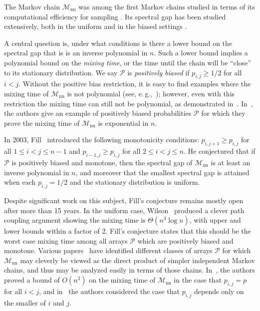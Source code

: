 \documentclass[11pt]{article}
\numberwithin{equation}{section}
\theoremstyle{definition}
\theoremstyle{plain}
\newcommand{\eg}{e.\,g.}
\newcommand{\cM}{\mathcal{M}}
\newcommand{\cP}{\mathcal{P}}
\newcommand{\mn}{\cM_{\text{nn}}}
\begin{document}
The Markov chain $\mn$ was among the first Markov chains studied in 
terms of its computational efficiency for sampling \cite{ald, diasha, 
dsc}. Its spectral gap has been studied extensively, both in 
the uniform and
in the  %
biased settings \cite{BBHM05,bmrs,DSC93b, diasha, wilson}. 

%
%
A central question is, %
under what conditions %
is there a lower bound on the spectral gap that is
is an inverse polynomial in $n$.
%
Such a lower bound    %
implies a polynomial
%
bound 
on the \emph{mixing time}, or the time until the chain will be 
``close'' to its stationary distribution. We say $\cP$ is 
\emph{positively biased} if $p_{i,j}\geq 1/2$ for all $i<j$.
Without the %
%
positive bias  %
restriction, it is easy to find examples where the mixing time of $\mn$ is
not polynomial (see, \eg,~\cite{bmrs}); 
however, even with this restriction the mixing time can still not be polynomial, as demonstrated in~\cite{bmrs}.  In~\cite{bmrs}, the authors give an example of positively biased probabilities $\cP$ for which they prove the mixing time of $\mn$ is exponential in $n.$

In 2003, %
Fill~\cite{F03}  %
introduced the following monotonicity 
conditions: $p_{i,j+1}\geq p_{i,j}$ for all $1\leq i<j\leq n-1$ and 
$p_{i-1,j}\geq p_{i,j}$ for all $2\leq i<j\leq n$.  He conjectured that  
if $\cP$ is positively biased and monotone, then the spectral gap of 
$\mn$ is  %
at least  %
an inverse polynomial in $n$, and moreover that the smallest 
spectral gap is attained when each $p_{i,j}=1/2$ and the stationary 
distribution is uniform. 

Despite significant work on this subject, Fill's conjecture remains 
mostly open after more than 15 years. In the uniform case, Wilson~\cite{wilson} produced a 
clever path coupling argument showing the mixing 
time is $\Theta(n^3\log n)$, with upper and lower bounds within a factor of 2. 
Fill's conjecture states that this should be the worst case mixing time among all 
arrays $\cP$ which are positively biased and monotone. 
%
%
%
%
%
Various papers~\cite{BBHM05, bmrs} have identified 
different classes of
arrays   %
$\cP$ for which $\mn$ may cleverly be viewed as 
the direct product of simpler independent Markov chains, and thus may 
be analyzed easily in terms of those chains. In~\cite{BBHM05}, the 
authors proved a bound of $O(n^2)$ on the mixing time of $\mn$ in the 
case that $p_{i,j} = p$ for all $i<j$, and in~\cite{bmrs} the authors 
considered the case that $p_{i,j}$ depends only on the smaller of $i$ 
and $j$.
\end{document}
